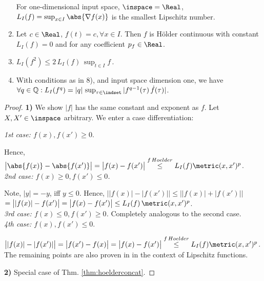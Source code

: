 \begin{lem}
\begin{enumerate}
	For one-dimensional input space, $\inspace = \Real$, $L_I(f) = \sup_{x \in I } \abs{\nabla f(x)}$ is the smallest Lipschitz number. 
	 \item Let $c \in \Real$, $f( t) = c, \forall x \in I $. Then $f$ is H\"older continuous with constant $L_I(f) =0$ and for any coefficient $p_f \in \Real$.  
	\item $L_I(f^2) \leq 2 \, L_I(f)\, \sup_{t \in I} f\,$.
	\item With conditions as in 8), and input space dimension one, we have $\forall q \in \mathbb Q : L_I(f^q) = |q| \,\sup_{\tau \in \indset } |f^{q-1}(\tau) \, \dot f(\tau)| $.
\end{enumerate}
\begin{proof}

\textbf{1)}  We show $|f|$ has the same constant and exponent as $f$. Let $X,X' \in \inspace $ arbitrary. 
We enter a case differentiation:

\textit{1st case: $f(x), f(x') \geq 0$}. 

Hence, $\bigl| \abs{f(x)}- \abs{f(x')} \bigr| = \bigl| f(x) - f(x') \bigr|  \stackrel{f \,Hoelder}{\leq} L_I(f) \metric(x,x')^{p}$.\\

\textit{2nd case: $f(x) \geq 0, f(x') \leq 0$.} 

Note, $|y| = - y$, iff $y \leq 0$. Hence,  $\bigl| |f(x)| - |f(x')| \bigr| \leq \bigl| |f(x)| + |f(x')| \bigr| $
$= \bigl| |f(x)| - f(x') \bigr|  =  \bigl| f(x) - f(x') \bigr| \leq L_I(f) \, \metric(x,x')^{p}$.\\

\textit{3rd case: $f(x) \leq 0, f(x') \geq 0$.} Completely analogous to the second case.\\

\textit{4th case: $f(x), f(x') \leq 0$}. 

$\bigl| |f(x)| - |f(x')| \bigr| = \bigl| f(x') - f(x) \bigr|= \bigl| f(x) - f(x') \bigr|  \stackrel{f \, Hoelder}{\leq} L_I(f) \metric(x,x')^{p}$.\\

The remaining points are also proven in \cite{Weaver1999} in the context of Lipschitz functions.

\textbf{2)} Special case of Thm. \ref{thm:hoelderconcat}.
%


\end{proof}
\end{lem}
